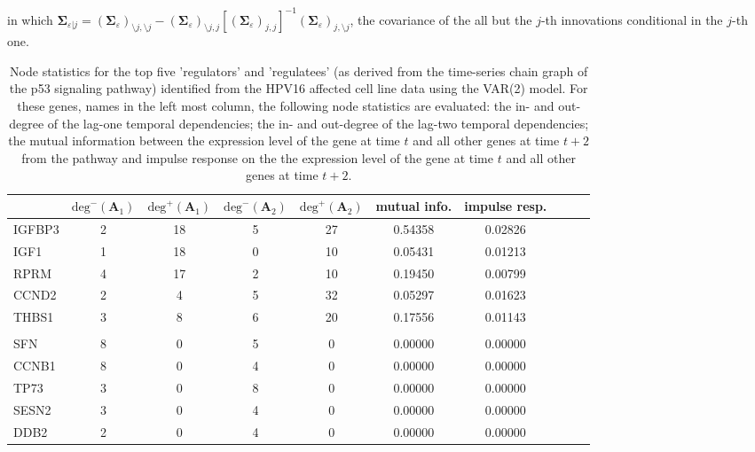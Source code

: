in which $\mathbf{\Sigma}_{\varepsilon | j} =
(\mathbf{\Sigma}_{\varepsilon})_{\setminus j, \setminus j} - (\mathbf{\Sigma}_{\varepsilon})_{\setminus j,j}[(\mathbf{\Sigma}_{\varepsilon})_{j,j}]^{-1} (\mathbf{\Sigma}_{\varepsilon})_{j,\setminus j}$, the covariance of the all but the $j$-th innovations conditional in the $j$-th one.

\newpage
\begin{table}
\caption{Node statistics for the top five 'regulators' and 'regulatees' (as derived from the time-series chain graph of the p53 signaling pathway) identified from the HPV16 affected cell line data using the VAR(2) model. For these genes, names in the left most column, the following node statistics are evaluated: the in- and out-degree of the lag-one temporal dependencies; the in- and out-degree of the lag-two temporal dependencies; the mutual information between the expression level of the gene at time $t$ and all other genes at time $t+2$ from the pathway and impulse response on the  the expression level of the gene at time $t$ and all other genes at time $t+2$.}
\begin{tabular}{l*{8}{c}r}
\hline
\hline          
             & $\mbox{deg}^-(\mathbf{A}_1)$ & $\mbox{deg}^+(\mathbf{A}_1)$  & $\mbox{deg}^-(\mathbf{A}_2)$ & $\mbox{deg}^+(\mathbf{A}_2)$  & mutual info. & impulse resp.  \\
\hline
IGFBP3       & 2 & 18 & 5 & 27 & 0.54358 & 0.02826 
\\
IGF1     & 1 & 18 & 0 & 10 & 0.05431 & 0.01213
\\
RPRM     & 4 & 17 & 2 & 10 & 0.19450 & 0.00799
\\
CCND2     & 2 & 4 & 5 & 32 & 0.05297 & 0.01623
\\
THBS1     & 3 & 8 & 6 & 20 & 0.17556 & 0.01143
\\
\\
SFN    & 8 & 0 & 5 & 0 & 0.00000 & 0.00000
\\
CCNB1        & 8 & 0 & 4 & 0 & 0.00000 & 0.00000
\\
TP73       & 3 & 0 & 8 & 0 & 0.00000 & 0.00000
\\
SESN2  & 3 & 0 & 4 & 0 & 0.00000 & 0.00000
\\
DDB2    & 2 & 0 & 4 & 0 & 0.00000 & 0.00000
\\
\hline
\end{tabular}
\label{table:postEstVAR2}
\end{table}

\mbox{ }

\newpage
